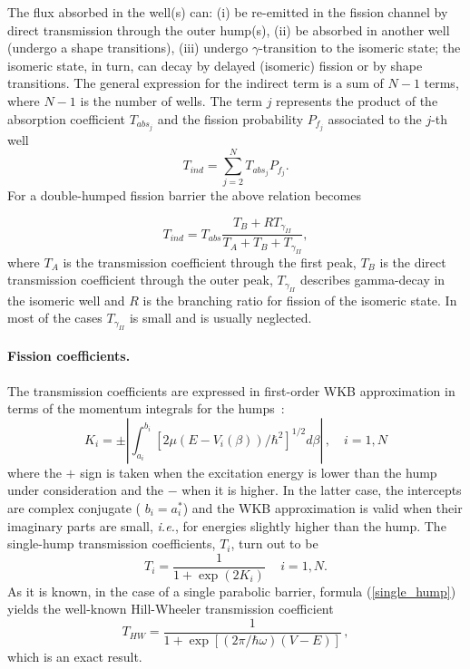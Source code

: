 \documentclass[twocolumn,amsmath,amssymb,10pt,groupedaddress,letter]{revtex4}
\begin{document}
The flux absorbed in the well(s) can:
\newline\qquad(i) be re-emitted in the fission channel by direct transmission
                  through the outer hump(s),
\newline\qquad(ii) be absorbed in another well (undergo a shape transitions),
\newline\qquad(iii) undergo $\gamma$-transition to the isomeric state; the
                   isomeric state, in turn, can decay by delayed (isomeric)
                   fission or by shape transitions.
The general expression for the indirect term is a sum of $N-1$ terms, where $N-1$ is the
number of wells. The term $j$ represents the product of the absorption coefficient $T_{abs_j}$
and the fission probability $P_{f_j}$ associated to the $j$-th well
%
\begin{equation}
T_{ind}=\sum_{j=2}^{N}T_{abs_j}P_{f_j}.
\label{tf1}
\end{equation}
%
For a double-humped fission barrier the above relation becomes


\begin{equation}
T_{ind}=T_{abs}\frac{T_{B}+RT_{\gamma_{II}}}
{T_{A}+T_{B}+T_{\gamma_{II}}},
\end{equation}
%
where $T_{A}$ is the transmission coefficient through the first peak, $T_{B}$ is the direct
transmission coefficient through the outer peak, $T_{\gamma _{II}}$
describes gamma-decay in the isomeric well and $R$ is the branching ratio for
fission of the isomeric state. In most of the cases $T_{\gamma _{II}}$ is
small and is usually neglected.

\medskip
\paragraph*{Fission coefficients.}
The transmission coefficients are expressed in first-order WKB approximation
in terms of the momentum integrals for the humps~\cite{Froman:65, FD70}:
\begin{equation}
K_{i}=\pm\left\vert \int_{a_{i}}^{b_{i}}[2\mu(E-V_{i}(\beta))/\hbar^{2}%
]^{1/2}d\beta\right\vert \,,\quad i=1,N
\end{equation}
where the $+$ sign is taken when the excitation energy is lower than the hump
under consideration and the $-$ when it is higher. In the latter case, the
intercepts are complex conjugate ( $b_{i}=a_{i}^{\ast}$) and the WKB
approximation is valid when their imaginary parts are small, \textit{i.e.},
for energies slightly higher than the hump. The single-hump transmission
coefficients, $T_{i}$, turn out to be
\begin{equation}
T_{i}=\frac{1}{1+\exp(2K_{i})}\,\quad i=1,N.
\label{single_hump}%
\end{equation}
%
As it is known, in the case of a single parabolic barrier, formula (\ref{single_hump}) yields the well-known
Hill-Wheeler transmission coefficient~\cite{Bjornholm:80}
\begin{equation}
T_{HW}=\frac{1}{1+\exp\left[  (2\pi/{\hbar\omega}){(V-E)}\right]
}\,,\label{HW}%
\end{equation}
which is an exact result.
\end{document}
